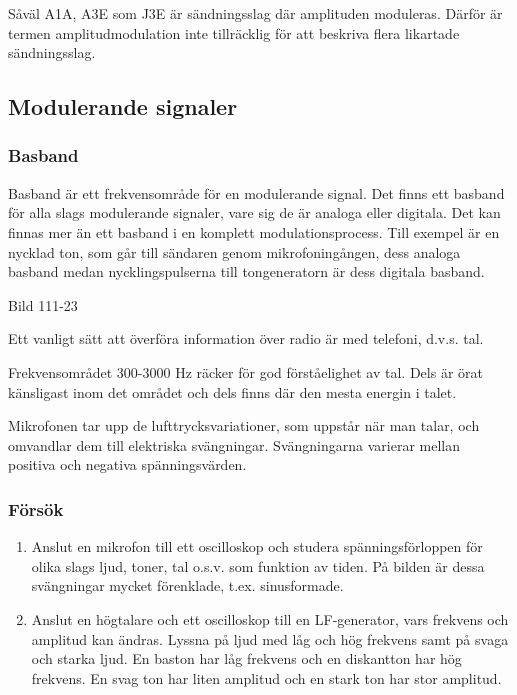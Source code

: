 Såväl A1A, A3E som J3E är sändningsslag där amplituden moduleras. Därför är
termen amplitudmodulation inte tillräcklig för att beskriva flera likartade sändningsslag.

\subsection{Modulerande signaler}

\subsubsection{Basband}

Basband är ett frekvensområde för en modulerande signal. Det finns ett basband för
alla slags modulerande signaler, vare sig de är analoga eller digitala. Det kan finnas mer
än ett basband i en komplett modulationsprocess. Till exempel är en nycklad ton, som
går till sändaren genom mikrofoningången, dess analoga basband medan nycklingspulserna
till tongeneratorn är dess digitala basband.

Bild 111-23

Ett vanligt sätt att överföra information över radio är med telefoni, d.v.s. tal.

Frekvensområdet 300-3000 Hz räcker för god förståelighet av tal. Dels är örat känsligast
inom det området och dels finns där den mesta energin i talet.

Mikrofonen tar upp de lufttrycksvariationer, som uppstår när man talar, och omvandlar dem
till elektriska svängningar. Svängningarna varierar mellan positiva och negativa
spänningsvärden.

\subsubsection{Försök}

\begin{enumerate}
\item Anslut en mikrofon till ett oscilloskop och studera spänningsförloppen för olika slags
ljud, toner, tal o.s.v. som funktion av tiden. På bilden är dessa svängningar mycket
förenklade, t.ex. sinusformade.

\item Anslut en högtalare och ett oscilloskop till en LF-generator, vars frekvens och amplitud
kan ändras. Lyssna på ljud med låg och hög frekvens samt på svaga och starka ljud. En
baston har låg frekvens och en diskantton har hög frekvens. En svag ton har liten
amplitud och en stark ton har stor amplitud.
\end{enumerate}

